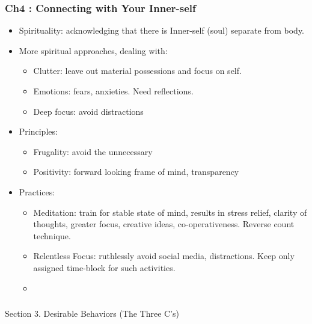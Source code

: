 \begin{frame}[fragile]\frametitle{Ch4 : Connecting with Your Inner-self }

\begin{itemize}
\item Spirituality: acknowledging that there is Inner-self (soul) separate from body.
\item More spiritual approaches, dealing with:
	\begin{itemize}
	\item Clutter: leave out material possessions and focus on self.
	\item Emotions: fears, anxieties. Need reflections.
	\item Deep focus: avoid distractions
	\end{itemize}
\item Principles:
	\begin{itemize}
	\item Frugality: avoid the unnecessary
	\item Positivity: forward looking frame of mind, transparency
	\end{itemize}
\item Practices:
	\begin{itemize}
	\item Meditation: train for stable state of mind, results in stress relief, clarity of thoughts, greater focus, creative ideas, co-operativeness. Reverse count technique.
	\item Relentless Focus: ruthlessly avoid social media, distractions. Keep only assigned time-block for such activities.
	\item 
	\end{itemize}	
\end{itemize}

\end{frame}

\begin{frame}[fragile]\frametitle{}
\begin{center}
{\Large Section 3. Desirable Behaviors (The Three C's)}

\end{center}
\end{frame}

